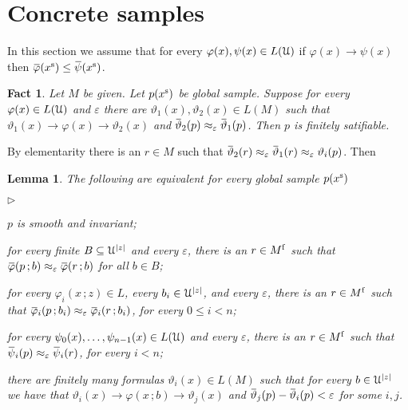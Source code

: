 \documentclass[10pt,openany]{article}
\newcommand{\mylabel}[1]{{\ssf{#1}}\hfill}
\renewenvironment{itemize}
  {\begin{list}{$\triangleright$}{%
   \setlength{\parskip}{0mm}
   \setlength{\topsep}{.4\baselineskip}
   \setlength{\rightmargin}{0mm}
   \setlength{\listparindent}{0mm}
   \setlength{\itemindent}{0mm}
   \setlength{\labelwidth}{3ex}
   \setlength{\itemsep}{.4\baselineskip}
   \setlength{\parsep}{0mm}
   \setlength{\partopsep}{0mm}
   \setlength{\labelsep}{1ex}
   \setlength{\leftmargin}{\labelwidth+\labelsep}
   \let\makelabel\mylabel}}{%
   \end{list}\vspace*{-\parskip}}
\newcommand{\sbar}[1]{\mkern 1.8mu\overline{\mkern-1.8mu#1\mkern-1mu}\mkern 1mu}
\def\imp{\rightarrow}
\def\U{\EuScript U}
\def\theta{\vartheta}
\def\phi{\varphi}
\def\epsilon{\varepsilon}
\def\ssf#1{\textsf{\small #1}}
\newcounter{thm}[section]
\theoremstyle{mio}
\newtheorem{lemma}[thm]{Lemma}
\newtheorem{fact}[thm]{Fact}
\theoremstyle{liscio}
\def\QED{\noindent\nolinebreak[4]\hspace{\stretch{1}}\rlap{\ \ $\Box$}\medskip}
\renewenvironment{proof}[1][Proof]%
{\begin{trivlist}\item[\hskip\labelsep {\bf #1}]}
{\QED\end{trivlist}}
\begin{document}
\section{Concrete samples}

In this section we assume that for every $\phi(x),\psi(x)\in L(\U)$ if $\phi(x)\imp\psi(x)$ then $\sbar\phi(x^{\rm s})\le\sbar\psi(x^{\rm s})$.


\begin{fact}
  Let $M$ be given.
  Let $p(x^{\rm s})$ be global sample.
  Suppose for every $\phi(x)\in L(\U)$ and $\epsilon$ there are $\theta_1(x), \theta_2(x)\in L(M)$ such that $\theta_1(x)\imp\phi(x)\imp\theta_2(x)$ and $\sbar\theta_2(p)\approx_\epsilon\sbar\theta_1(p)$.
  Then $p$ is finitely satifiable.
\end{fact}

\begin{proof}
  By elementarity there is an $r\in M$ such that $\sbar\theta_2(r)\approx_\epsilon\sbar\theta_1(r)\approx_\epsilon\theta_i(p)$. Then 
\end{proof}





\begin{lemma}
  The following are equivalent for every global sample $p(x^{\rm s})$
  \begin{itemize}
    \item[1.] $p$ is smooth and invariant;
    \item[2.] for every finite $B\subseteq\U^{|z|}$ and every $\epsilon$, there is an $r\in M^{\rm f}$ such that $\sbar\phi(p\,;b)\approx_\epsilon\sbar\phi(r\,;b)$ for all $b\in B$;
    \item[2.] for every $\phi_i(x\,;z)\in L$, every $b_i\in\U^{|z|}$, and every $\epsilon$, there is an $r\in M^{\rm f}$ such that $\sbar\phi_i(p\,;b_i)\approx_\epsilon\sbar\phi_i(r\,;b_i)$, for every $0\le i<n$;
    \item[2.] for every $\psi_0(x),\dots,\psi_{n-1}(x)\in L(\U)$ and every $\epsilon$, there is an $r\in M^{\rm f}$ such that $\sbar\psi_i(p)\approx_\epsilon\sbar\psi_i(r)$, for every $i<n$;
    \item[4.] there are finitely many formulas $\theta_i(x)\in L(M)$ such that for every $b\in\U^{|z|}$ we have that $\theta_i(x)\imp\phi(x\,;b)\imp\theta_j(x)$ and $\sbar\theta_j(p)-\sbar\theta_i(p)<\epsilon$ for some $i,j$.
  \end{itemize}
\end{lemma}
\end{document}
